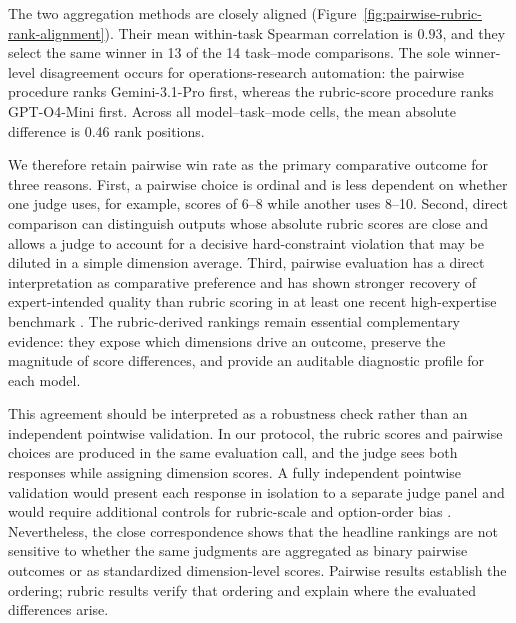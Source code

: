 The two aggregation methods are closely aligned
(Figure~\ref{fig:pairwise-rubric-rank-alignment}). Their mean within-task
Spearman correlation is $0.93$, and they select the same winner in 13 of the
14 task--mode comparisons. The sole winner-level disagreement occurs for
operations-research automation: the pairwise procedure ranks
Gemini-3.1-Pro first, whereas the rubric-score procedure ranks GPT-O4-Mini
first. Across all model--task--mode cells, the mean absolute difference is
0.46 rank positions.

We therefore retain pairwise win rate as the primary comparative outcome for
three reasons. First, a pairwise choice is ordinal and is less dependent on
whether one judge uses, for example, scores of 6--8 while another uses 8--10.
Second, direct comparison can distinguish outputs whose absolute rubric scores
are close and allows a judge to account for a decisive hard-constraint
violation that may be diluted in a simple dimension average. Third, pairwise
evaluation has a direct interpretation as comparative preference and has shown
stronger recovery of expert-intended quality than rubric scoring in at least
one recent high-expertise benchmark \citep{yang2026judgmentbench}. The
rubric-derived rankings remain essential complementary evidence: they expose
which dimensions drive an outcome, preserve the magnitude of score
differences, and provide an auditable diagnostic profile for each model.

This agreement should be interpreted as a robustness check rather than an
independent pointwise validation. In our protocol, the rubric scores and
pairwise choices are produced in the same evaluation call, and the judge sees
both responses while assigning dimension scores. A fully independent pointwise
validation would present each response in isolation to a separate judge panel
and would require additional controls for rubric-scale and option-order bias
\citep{xu2026pointwisepairwise}. Nevertheless, the close correspondence shows
that the headline rankings are not sensitive to whether the same judgments are
aggregated as binary pairwise outcomes or as standardized dimension-level
scores. Pairwise results establish the ordering; rubric results verify that
ordering and explain where the evaluated differences arise.
